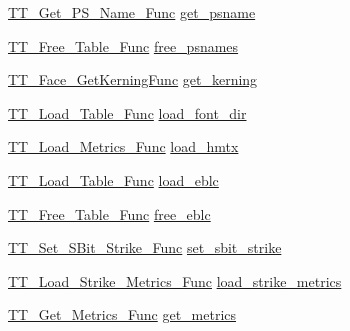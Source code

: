 \begin{DoxyCompactItemize}
\item 
\hyperlink{sfnt_8h_ad665f5472642a74f84f7ea94840adcd0}{T\-T\-\_\-\-Get\-\_\-\-P\-S\-\_\-\-Name\-\_\-\-Func} \hyperlink{struct_s_f_n_t___interface___a08c388ef2f20f9452600fffeaf051183}{get\-\_\-psname}
\item 
\hyperlink{sfnt_8h_a1dd1cdaed95812837450ce8579f2d076}{T\-T\-\_\-\-Free\-\_\-\-Table\-\_\-\-Func} \hyperlink{struct_s_f_n_t___interface___a4d73e810a4e0bc018b7ca935822e4eec}{free\-\_\-psnames}
\item 
\hyperlink{sfnt_8h_ac9eee2d5c835c3f5085cc5c7947a210c}{T\-T\-\_\-\-Face\-\_\-\-Get\-Kerning\-Func} \hyperlink{struct_s_f_n_t___interface___a73b00cba7226978783efdcc928330eb9}{get\-\_\-kerning}
\item 
\hyperlink{sfnt_8h_a91c8b8234760c9e3208e37c15cf1663c}{T\-T\-\_\-\-Load\-\_\-\-Table\-\_\-\-Func} \hyperlink{struct_s_f_n_t___interface___a30af6672f274638bb0b0c7546e58d470}{load\-\_\-font\-\_\-dir}
\item 
\hyperlink{sfnt_8h_aa7af5d423da421bd08dd11fe4c5bfc6c}{T\-T\-\_\-\-Load\-\_\-\-Metrics\-\_\-\-Func} \hyperlink{struct_s_f_n_t___interface___aea4dd40109dec64e4feb53462d3a54d0}{load\-\_\-hmtx}
\item 
\hyperlink{sfnt_8h_a91c8b8234760c9e3208e37c15cf1663c}{T\-T\-\_\-\-Load\-\_\-\-Table\-\_\-\-Func} \hyperlink{struct_s_f_n_t___interface___a2b6d7cb72644cc5e36ca67e4aeed55e1}{load\-\_\-eblc}
\item 
\hyperlink{sfnt_8h_a1dd1cdaed95812837450ce8579f2d076}{T\-T\-\_\-\-Free\-\_\-\-Table\-\_\-\-Func} \hyperlink{struct_s_f_n_t___interface___a043a22a8dd45b30dc6e8e5cb7be8dc44}{free\-\_\-eblc}
\item 
\hyperlink{sfnt_8h_a38e5cf40419172333be0e72eb9559f5d}{T\-T\-\_\-\-Set\-\_\-\-S\-Bit\-\_\-\-Strike\-\_\-\-Func} \hyperlink{struct_s_f_n_t___interface___ab9e73d79753ea4a492c1cf66aee8e518}{set\-\_\-sbit\-\_\-strike}
\item 
\hyperlink{sfnt_8h_a6a50e6e90783fded0665160750c109cd}{T\-T\-\_\-\-Load\-\_\-\-Strike\-\_\-\-Metrics\-\_\-\-Func} \hyperlink{struct_s_f_n_t___interface___a285149d0d4f00f2b862e3db45205cfa0}{load\-\_\-strike\-\_\-metrics}
\item 
\hyperlink{sfnt_8h_ad5952dd59b4f5722c69ed1b0bbe788a1}{T\-T\-\_\-\-Get\-\_\-\-Metrics\-\_\-\-Func} \hyperlink{struct_s_f_n_t___interface___a32ceff5842782c1cf7d7992e40cc858e}{get\-\_\-metrics}
\end{DoxyCompactItemize}


